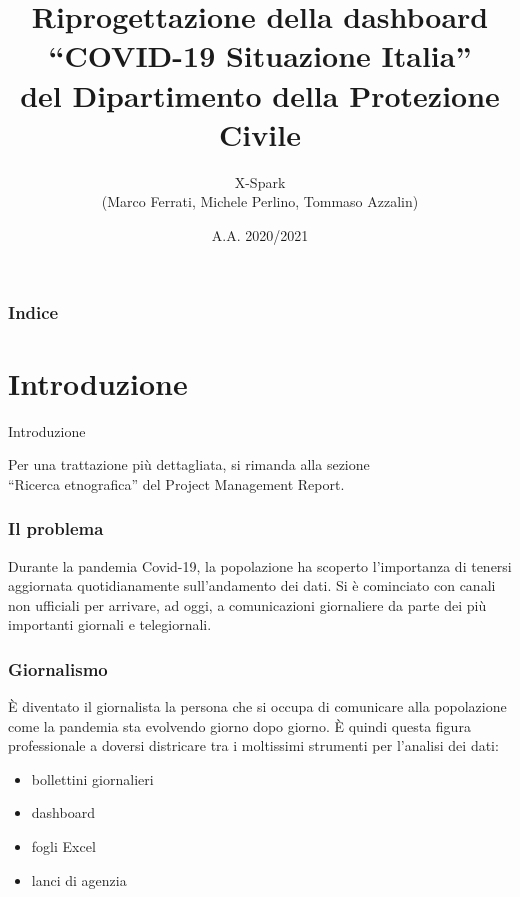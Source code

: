 \documentclass[handout]{beamer}
\title[Riprogettazione della dashboard\\``COVID-19 Situazione Italia'']{Riprogettazione della dashboard\\``COVID-19 Situazione Italia''\\del Dipartimento della Protezione Civile}
\author[X-Spark]{X-Spark\\\large(Marco Ferrati, Michele Perlino, Tommaso Azzalin)}
\institute[UniBo]{LM Informatica\\
Università di Bologna - Alma Mater Studiorum}
\date{A.A. 2020/2021}
\begin{document}
	\begin{frame}[plain]
	  \titlepage
	\end{frame}
	\begin{frame}
  		\frametitle{Indice}
		\tableofcontents
	\end{frame}
	
	\section{Introduzione}
		\begin{frame}
			\centering
			\begin{Huge}
				Introduzione
			\end{Huge}
			\mbox{}
			\vfill
			\vspace*{100px}
			\begin{scriptsize}
				Per una trattazione più dettagliata, si rimanda alla sezione\\``Ricerca etnografica'' del Project Management Report.
			\end{scriptsize}
		\end{frame}
		\begin{frame}
			\frametitle{Il problema}
			Durante la pandemia Covid-19, la popolazione ha scoperto l'importanza di tenersi aggiornata quotidianamente sull'andamento dei dati.\newline \newline
			Si è cominciato con canali non ufficiali per arrivare, ad oggi, a comunicazioni giornaliere da parte dei più importanti giornali e telegiornali.
		\end{frame}

		\begin{frame}
			\frametitle{Giornalismo}
			\`E diventato il giornalista la persona che si occupa di comunicare alla popolazione come la pandemia sta evolvendo giorno dopo giorno.\newline \newline
			\`E quindi questa figura professionale a doversi districare tra i moltissimi strumenti per l'analisi dei dati:
			\begin{itemize}[<+->]
				\item bollettini giornalieri\\
				\item dashboard\\
				\item fogli Excel\\
				\item lanci di agenzia\\
			\end{itemize}
		\end{frame}
\end{document}

